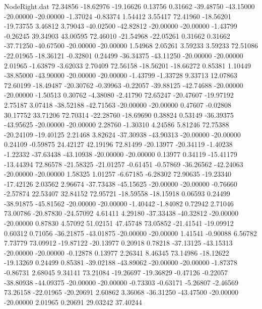 \begin{filecontents}{NodeRight.dat}
  72.34856  -18.62976  -19.16626     0.13756    0.31662  -39.48750  -43.15000  -20.00000  -20.00000   -1.37024   -0.83374    1.54412    3.55417
  72.41960  -18.56201  -19.73755     3.46812    3.79043  -40.02500  -42.82812  -20.00000  -20.00000   -1.43799   -0.26245   39.34903   43.00595
  72.46010  -21.54968  -22.05261     0.31662    0.31662  -37.71250  -40.67500  -20.00000  -20.00000    1.54968    2.05261    3.59233    3.59233
  72.51086  -22.01965  -18.36121    -0.32801    0.24499  -36.34375  -43.11250  -20.00000  -20.00000    2.01965   -1.63879   -3.62033    2.70409
  72.56158  -18.56201  -18.66272     0.85381    1.10449  -38.85000  -43.90000  -20.00000  -20.00000   -1.43799   -1.33728    9.33713   12.07863
  72.60199  -18.49487  -20.30762    -0.39963   -0.22057  -39.88125  -42.74688  -20.00000  -20.00000   -1.50513    0.30762   -4.38080   -2.41790
  72.65247  -20.47607  -19.97192     2.75187    3.07418  -38.52188  -42.71563  -20.00000  -20.00000    0.47607   -0.02808   30.17752   33.71206
  72.70314  -22.28760  -18.69690     0.38824    0.53149  -36.39375  -43.95625  -20.00000  -20.00000    2.28760   -1.30310    4.24586    5.81246
  72.75388  -20.24109  -19.40125     2.21468    3.82624  -37.30938  -43.90313  -20.00000  -20.00000    0.24109   -0.59875   24.42127   42.19196
  72.81499  -20.13977  -20.34119    -1.40238   -1.22332  -37.63438  -43.10938  -20.00000  -20.00000    0.13977    0.34119  -15.41179  -13.44394
  72.86578  -21.58325  -21.01257    -0.61451   -0.57869  -36.26562  -42.24063  -20.00000  -20.00000    1.58325    1.01257   -6.67185   -6.28302
  72.90635  -19.23340  -17.42126     2.03562    2.96674  -37.73438  -45.15625  -20.00000  -20.00000   -0.76660   -2.57874   22.53407   32.84152
  72.95721  -18.59558  -18.15918     0.06593    0.24499  -38.91875  -45.81562  -20.00000  -20.00000   -1.40442   -1.84082    0.72942    2.71046
  73.00786  -20.87830  -24.57092     4.61411    4.29180  -37.33438  -40.32812  -20.00000  -20.00000    0.87830    4.57092   51.02151   47.45748
  73.05852  -21.41541  -19.09912     0.60312    0.71056  -36.21875  -43.01875  -20.00000  -20.00000    1.41541   -0.90088    6.56782    7.73779
  73.09912  -19.87122  -20.13977     0.20918    0.78218  -37.13125  -43.15313  -20.00000  -20.00000   -0.12878    0.13977    2.26341    8.46345
  73.14986  -18.12622  -19.13269     0.24499    0.85381  -39.02188  -43.89062  -20.00000  -20.00000   -1.87378   -0.86731    2.68045    9.34141
  73.21084  -19.26697  -19.36829    -0.47126   -0.22057  -38.80938  -44.09375  -20.00000  -20.00000   -0.73303   -0.63171   -5.26807   -2.46569
  73.26158  -22.01965  -20.20691     2.60862    3.36068  -36.31250  -43.47500  -20.00000  -20.00000    2.01965    0.20691   29.03242   37.40244

\end{filecontents}

